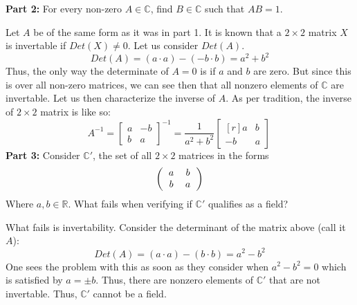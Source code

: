 \documentclass[12pt, letterpaper]{article}
\begin{document}
 \noindent\textbf{Part 2:} For every non-zero $A \in \mathbb{C}$, find $B \in \mathbb{C}$ such that $AB = 1$.

 Let $A$ be of the same form as it was in part 1. It is known that a $2 \times 2$ matrix $X$ is invertable if $Det(X) \neq 0$. Let us consider $Det(A)$.
 $$ Det(A) = (a \cdot a) - (-b \cdot b) = a^2 + b^2 $$
 Thus, the only way the determinate of $A = 0$ is if $a$ and $b$ are zero.
 But since this is over all non-zero matrices, we can see then that all nonzero elements of $\mathbb{C}$ are invertable. Let us then characterize the inverse of $A$.
 As per tradition, the inverse of $2 \times 2$ matrix is like so:
 \[
A^{-1}=\begin{bmatrix}
          a & -b \\
          b & a
       \end{bmatrix}^{-1}
      =\frac{1}{a^2 + b^2}
       \begin{bmatrix*}[r]
           a & b \\
          -b &  a
       \end{bmatrix*} \,
\]
\noindent\textbf{Part 3:} Consider $\mathbb{C}'$, the set of all $2 \times 2$ matrices in the forms
\[
\left(
  \begin{tabular}{cc}
  $a$ & $b$ \\
  $b$ & $a$
  \end{tabular}
\right)
\]
Where $a, b \in \mathbb{R}$. What fails when verifying if $\mathbb{C}'$ qualifies as a field?

\noindent What fails is invertability. Consider the determinant of the matrix above (call it $A$):
$$ Det(A) = (a \cdot a) - (b \cdot b) = a^2 - b^2 $$
One sees the problem with this as soon as they consider when $a^2 - b^2 = 0$ which is satisfied by $a = \pm b$.
Thus, there are nonzero elements of $\mathbb{C}'$ that are not invertable. Thus, $\mathbb{C}'$ cannot be a field.
\end{document}
